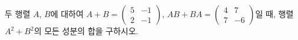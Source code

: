 \hspace*{2mm}\begin{minipage}[t]{\dimexpr\linewidth-2mm\relax}\vspace{0pt}
두 행렬 $A$, $B$에 대하여 $A+B=\begin{pmatrix} 5 & -1 \\ 2 & -1 \end{pmatrix}$, $AB+BA=\begin{pmatrix} 4 & 7 \\ 7 & -6 \end{pmatrix}$일 때, 행렬 $A^2+B^2$의 모든 성분의 합을 구하시오.\end{minipage}

